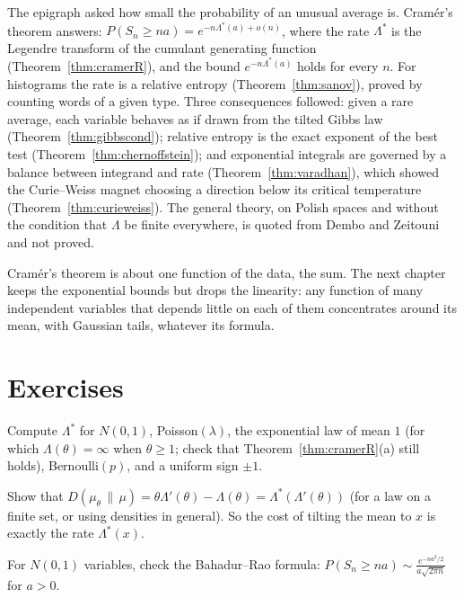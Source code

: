 The epigraph asked how small the probability of an unusual average is. Cram\'er's theorem answers: $P(S_n\ge na)=e^{-n\Lambda^*(a)+o(n)}$, where the rate
$\Lambda^*$ is the Legendre transform of the cumulant generating function (Theorem~\ref{thm:cramerR}), and the bound $e^{-n\Lambda^*(a)}$ holds for every $n$. For
histograms the rate is a relative entropy (Theorem~\ref{thm:sanov}), proved by counting words of a given type. Three consequences followed: given a rare
average, each variable behaves as if drawn from the tilted Gibbs law (Theorem~\ref{thm:gibbscond}); relative entropy is the exact exponent of the best
test (Theorem~\ref{thm:chernoffstein}); and exponential integrals are governed by a balance between integrand and rate (Theorem~\ref{thm:varadhan}), which
showed the Curie--Weiss magnet choosing a direction below its critical temperature (Theorem~\ref{thm:curieweiss}). The general theory, on Polish spaces and
without the condition that $\Lambda$ be finite everywhere, is quoted from Dembo and Zeitouni and not proved.

Cram\'er's theorem is about one function of the data, the sum. The next chapter keeps the exponential bounds but drops the linearity: any function of
many independent variables that depends little on each of them concentrates around its mean, with Gaussian tails, whatever its formula.

\section{Exercises}

\begin{exercise}[$\star$]\label{ex:ratefns}
Compute $\Lambda^*$ for $N(0,1)$, Poisson$(\lambda)$, the exponential law of mean $1$ (for which $\Lambda(\theta)=\infty$ when $\theta\ge1$; check that Theorem~\ref{thm:cramerR}(a) still
holds), Bernoulli$(p)$, and a uniform sign $\pm1$.
\end{exercise}

\begin{exercise}[$\star$]\label{ex:tiltentropy}
Show that $D(\mu_\theta\,\|\,\mu)=\theta\Lambda'(\theta)-\Lambda(\theta)=\Lambda^*(\Lambda'(\theta))$ (for a law on a finite set, or using densities in general). So the cost of tilting the mean to $x$
is exactly the rate $\Lambda^*(x)$.
\end{exercise}

\begin{exercise}[$\star$]\label{ex:gaussprefactor}
For $N(0,1)$ variables, check the Bahadur--Rao formula: $P(S_n\ge na)\sim\frac{e^{-na^2/2}}{a\sqrt{2\pi n}}$ for $a>0$.
\end{exercise}

